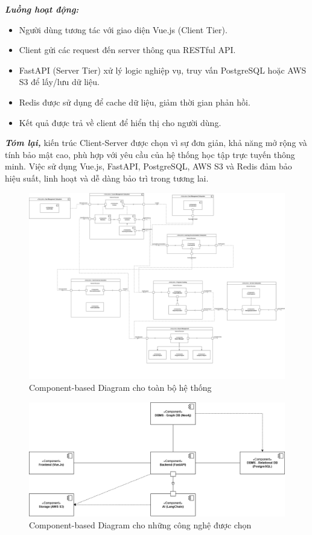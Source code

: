 \textbf{\textit{Luồng hoạt động:}}
\begin{itemize}
    \item Người dùng tương tác với giao diện Vue.js (Client Tier).
    \item Client gửi các request đến server thông qua RESTful API.
    \item FastAPI (Server Tier) xử lý logic nghiệp vụ, truy vấn PostgreSQL hoặc AWS S3 để lấy/lưu dữ liệu.
    \item Redis được sử dụng để cache dữ liệu, giảm thời gian phản hồi.
    \item Kết quả được trả về client để hiển thị cho người dùng.
\end{itemize}

\textbf{\textit{Tóm lại,}} kiến trúc Client-Server được chọn vì sự đơn giản, khả năng mở rộng và tính bảo mật cao, phù hợp với yêu cầu của hệ thống học tập trực tuyến thông minh. Việc sử dụng Vue.js, FastAPI, PostgreSQL, AWS S3 và Redis đảm bảo hiệu suất, linh hoạt và dễ dàng bảo trì trong tương lai.
\begin{figure}[H]
    \centering
    \includegraphics[width=\linewidth]{Images/component_diagram/component-All.drawio.png}
    \caption{Component-based Diagram cho toàn bộ hệ thống}
    \label{fig:enter-label}
\end{figure}
\begin{figure}[H]
    \centering
    \includegraphics[width=\linewidth]{Images/component_diagram/component-Selected technologies.drawio.png}
    \caption{Component-based Diagram cho những công nghệ được chọn}
    \label{fig:enter-label}
\end{figure}